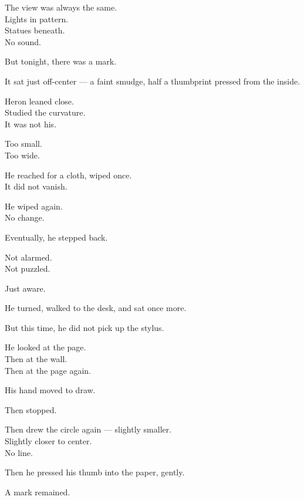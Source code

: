 \documentclass[9pt]{article}
\begin{document}
\vspace{1em}

The view was always the same.\\
Lights in pattern.\\
Statues beneath.\\
No sound.

But tonight, there was a mark.

\vspace{1em}

It sat just off-center — a faint smudge, half a thumbprint pressed from the inside.

Heron leaned close.\\
Studied the curvature.\\
It was not his.

Too small.\\
Too wide.

\vspace{1em}

He reached for a cloth, wiped once.\\
It did not vanish.

He wiped again.\\
No change.

Eventually, he stepped back.

Not alarmed.\\
Not puzzled.

Just aware.

\vspace{1em}

He turned, walked to the desk, and sat once more.

But this time, he did not pick up the stylus.

He looked at the page.\\
Then at the wall.\\
Then at the page again.

\vspace{1em}

His hand moved to draw.

Then stopped.

Then drew the circle again — slightly smaller.\\
Slightly closer to center.\\
No line.

Then he pressed his thumb into the paper, gently.

A mark remained.

\vspace{1em}
\end{document}
